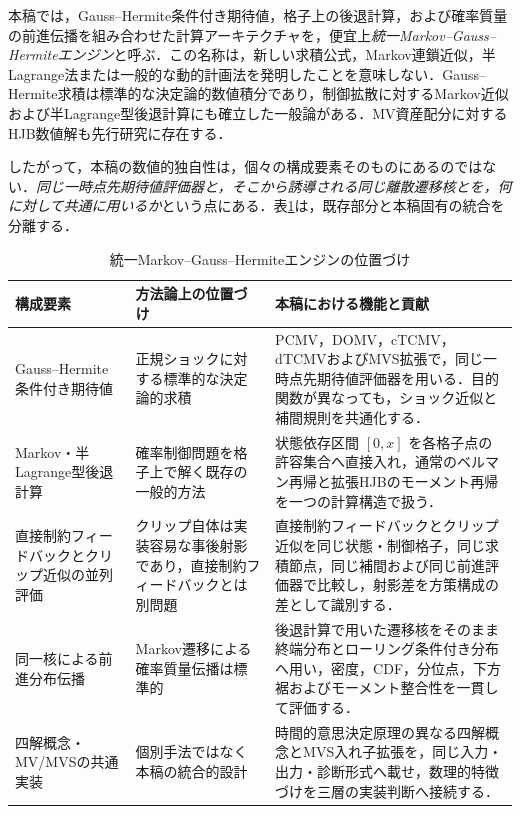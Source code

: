 \documentclass[10pt,a4paper]{article}
\theoremstyle{plain}
\theoremstyle{definition}
\begin{document}
本稿では，Gauss--Hermite条件付き期待値，格子上の後退計算，および確率質量の前進伝播を組み合わせた計算アーキテクチャを，便宜上\emph{統一Markov--Gauss--Hermiteエンジン}と呼ぶ．この名称は，新しい求積公式，Markov連鎖近似，半Lagrange法または一般的な動的計画法を発明したことを意味しない．Gauss--Hermite求積は標準的な決定論的数値積分であり\citep{AbramowitzStegun1972,Judd1998}，制御拡散に対するMarkov近似および半Lagrange型後退計算にも確立した一般論がある\citep{KushnerDupuis2001,FalconeFerretti2014}．MV資産配分に対するHJB数値解も先行研究に存在する\citep{WangForsyth2012,WangForsyth2012Comparison}．

したがって，本稿の数値的独自性は，個々の構成要素そのものにあるのではない．\emph{同じ一時点先期待値評価器と，そこから誘導される同じ離散遷移核とを，何に対して共通に用いるか}という点にある．表\ref{tab:gh-engine-positioning}は，既存部分と本稿固有の統合を分離する．

\begin{table}[htbp]
\centering\small
\caption{統一Markov--Gauss--Hermiteエンジンの位置づけ}
\label{tab:gh-engine-positioning}
\begin{tabularx}{\textwidth}{p{34mm}p{43mm}X}
\toprule
構成要素 & 方法論上の位置づけ & 本稿における機能と貢献 \\
\midrule
Gauss--Hermite条件付き期待値
& 正規ショックに対する標準的な決定論的求積
& PCMV，DOMV，cTCMV，dTCMVおよびMVS拡張で，同じ一時点先期待値評価器を用いる．目的関数が異なっても，ショック近似と補間規則を共通化する．\\
Markov・半Lagrange型後退計算
& 確率制御問題を格子上で解く既存の一般的方法
& 状態依存区間 $[0,x]$ を各格子点の許容集合へ直接入れ，通常のベルマン再帰と拡張HJBのモーメント再帰を一つの計算構造で扱う．\\
直接制約フィードバックとクリップ近似の並列評価
& クリップ自体は実装容易な事後射影であり，直接制約フィードバックとは別問題
& 直接制約フィードバックとクリップ近似を同じ状態・制御格子，同じ求積節点，同じ補間および同じ前進評価器で比較し，射影差を方策構成の差として識別する．\\
同一核による前進分布伝播
& Markov遷移による確率質量伝播は標準的
& 後退計算で用いた遷移核をそのまま終端分布とローリング条件付き分布へ用い，密度，CDF，分位点，下方裾およびモーメント整合性を一貫して評価する．\\
四解概念・MV/MVSの共通実装
& 個別手法ではなく本稿の統合的設計
& 時間的意思決定原理の異なる四解概念とMVS入れ子拡張を，同じ入力・出力・診断形式へ載せ，数理的特徴づけを三層の実装判断へ接続する．\\
\bottomrule
\end{tabularx}
\end{table}
\end{document}
